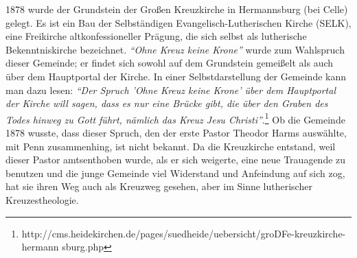 1878 wurde der Grundstein der Großen Kreuzkirche in Hermannsburg (bei Celle)
gelegt. Es ist ein Bau der Selbständigen Evangelisch-Lutherischen Kirche (SELK),
eine Freikirche altkonfessioneller Prägung, die sich selbst als lutherische
Bekenntniskirche bezeichnet. \textit{"`Ohne Kreuz keine Krone"'} wurde zum Wahlspruch
dieser Gemeinde; er findet sich sowohl auf dem Grundstein gemeißelt als auch
über dem Hauptportal der Kirche. In einer Selbstdarstellung der Gemeinde kann
man dazu lesen: \textit{"`Der Spruch 'Ohne Kreuz keine Krone' über dem Hauptportal der
Kirche will sagen, dass es nur eine Brücke gibt, die über den Graben des Todes
hinweg zu Gott führt, nämlich das Kreuz Jesu
Christi"'}.\footnote{
http://cms.heidekirchen.de/pages/suedheide/uebersicht/groDFe-kreuzkirche-hermann
sburg.php} Ob die Gemeinde 1878
wusste, dass dieser Spruch, den der erste Pastor Theodor Harms auswählte, mit Penn zusammenhing,
ist nicht bekannt. Da die Kreuzkirche entstand, weil dieser Pastor amtsenthoben wurde, als er sich
weigerte, eine neue Trauagende zu benutzen und die junge Gemeinde viel Widerstand und Anfeindung
auf sich zog, hat sie ihren Weg auch als Kreuzweg gesehen, aber im Sinne lutherischer Kreuzestheologie.

\medskip

